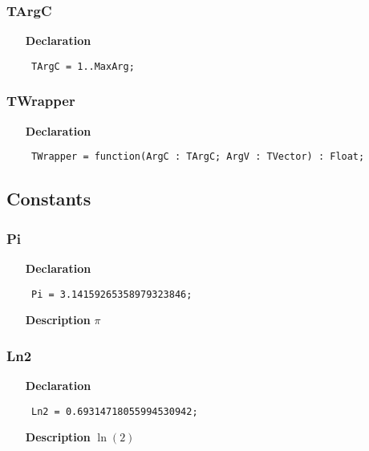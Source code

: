 \documentclass[12pt,a4paper,oneside]{report}
\newcommand{\declarationitem}[1]{\textbf{#1}}
\newcommand{\descriptiontitle}[1]{\textbf{#1}}
\newcommand{\code}[1]{\texttt{#1}}
\begin{document}
\subsubsection{TArgC}
\label{utypes-TArgC}
\begin{itemize}\item[\declarationitem{Declaration}\hfill]
	\begin{flushleft}
		\code{
			TArgC = 1..MaxArg;}
	\end{flushleft}
\end{itemize}

\subsubsection{TWrapper}
\label{utypes-TWrapper}
\begin{itemize}\item[\declarationitem{Declaration}\hfill]
	\begin{flushleft}
		\code{
			TWrapper = function(ArgC : TArgC; ArgV : TVector) : Float;}
	\end{flushleft}
\end{itemize}

\subsection{Constants}
\subsubsection{Pi}
\label{utypes-Pi}
\begin{itemize}\item[\declarationitem{Declaration}\hfill]
	\begin{flushleft}
		\code{
			Pi         = 3.14159265358979323846;}
		
	\end{flushleft}
	
	\par
	\item[\descriptiontitle{Description}]
	$\pi$
	
\end{itemize}
\subsubsection{Ln2}
\label{utypes-Ln2}
\begin{itemize}\item[\declarationitem{Declaration}\hfill]
	\begin{flushleft}
		\code{
			Ln2        = 0.69314718055994530942;}
		
	\end{flushleft}
	
	\par
	\item[\descriptiontitle{Description}]
	$\ln(2)$
	
\end{itemize}
\end{document}
